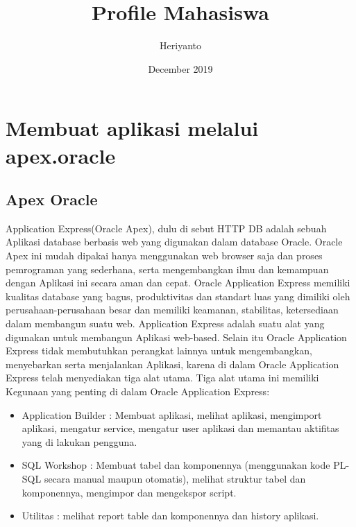 \documentclass[12pt, times new roman]{article}
\title{Profile Mahasiswa}
\author{Heriyanto}
\date{December 2019}
\begin{document}
\maketitle
\section{Membuat aplikasi melalui apex.oracle}
\subsection{Apex Oracle}
Application Express(Oracle Apex), dulu di sebut HTTP DB adalah sebuah Aplikasi database berbasis web yang digunakan dalam database Oracle. Oracle Apex ini mudah dipakai hanya menggunakan web browser saja dan proses pemrograman yang sederhana, serta mengembangkan ilmu dan kemampuan dengan Aplikasi ini secara aman dan cepat. Oracle Application Express memiliki kualitas database yang bagus, produktivitas dan standart luas yang dimiliki oleh perusahaan-perusahaan besar dan memiliki keamanan, stabilitas, ketersediaan dalam membangun suatu web. Application Express adalah suatu alat yang digunakan untuk membangun Aplikasi web-based. Selain itu Oracle Application Express tidak membutuhkan perangkat lainnya untuk mengembangkan, menyebarkan serta menjalankan Aplikasi, karena di dalam Oracle Application Express telah menyediakan tiga alat utama. Tiga alat utama ini memiliki Kegunaan yang penting di dalam Oracle Application Express:
\begin{itemize}
\item Application Builder : Membuat aplikasi, melihat aplikasi, mengimport aplikasi, mengatur service, mengatur user aplikasi dan memantau aktifitas yang di lakukan pengguna.
\item SQL Workshop : Membuat tabel dan komponennya (menggunakan kode PL-SQL secara manual maupun otomatis), melihat struktur tabel dan komponennya, mengimpor dan mengekspor script.
\item Utilitas : melihat report table dan komponennya dan history aplikasi.
\end{itemize}
\end{document}
